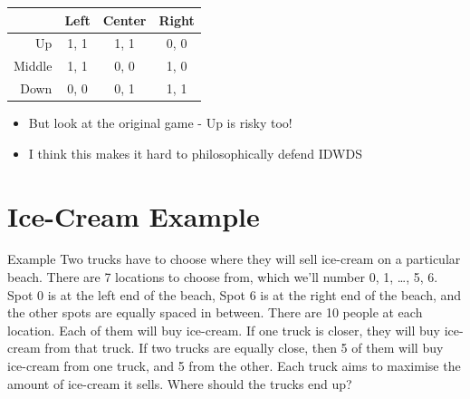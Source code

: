 \documentclass[
  14pt,
  letterpaper,
  ignorenonframetext,
  aspectratio=169,
  handout]{beamer}
\providecommand{\tightlist}{%
  \setlength{\itemsep}{0pt}\setlength{\parskip}{0pt}}\usepackage{longtable,booktabs,array}
\let\olditem\item
\renewcommand{\item}{%
\olditem\vspace{6pt}}
\begin{document}
\begin{frame}
\begin{table}[!h]
\centering
\begin{tabular}[t]{>{}r|ccc}
\toprule
 & Left & Center & Right\\
\midrule
Up & 1, 1 & 1, 1 & 0, 0\\
Middle & 1, 1 & 0, 0 & 1, 0\\
Down & 0, 0 & 0, 1 & 1, 1\\
\bottomrule
\end{tabular}
\end{table}

\begin{itemize}[<+->]
\tightlist
\item
  But look at the original game - Up is risky too!
\item
  I think this makes it hard to philosophically defend IDWDS
\end{itemize}
\end{frame}

\hypertarget{ice-cream-example}{%
\section{Ice-Cream Example}\label{ice-cream-example}}

\begin{frame}{Example}
\protect\hypertarget{example}{}
Two trucks have to choose where they will sell ice-cream on a particular
beach. There are 7 locations to choose from, which we'll number 0, 1,
\ldots, 5, 6. Spot 0 is at the left end of the beach, Spot 6 is at the
right end of the beach, and the other spots are equally spaced in
between. There are 10 people at each location. Each of them will buy
ice-cream. If one truck is closer, they will buy ice-cream from that
truck. If two trucks are equally close, then 5 of them will buy
ice-cream from one truck, and 5 from the other. Each truck aims to
maximise the amount of ice-cream it sells. Where should the trucks end
up?
\end{frame}
\end{document}
